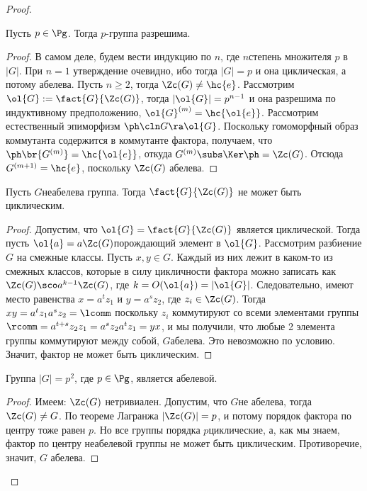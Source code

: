 \documentclass[a4paper]{article}
\newcommand{\kph}{\Ker \ph}
\begin{document}
\begin{proof}
\begin{theorem}
Пусть $p \in \Pg$. Тогда $p$-группа разрешима.
\end{theorem}
\begin{proof}
В самом деле, будем вести индукцию по $n$, где $n$\т степень множителя  $p$ в $|G|$. При $n=1$ утверждение
очевидно, ибо тогда $|G|=p$ и она циклическая, а потому абелева. Пусть $n \ge 2$, тогда $\Zc(G) \neq \hc{e}$.
Рассмотрим $\ol{G} := \fact{G}{\Zc(G)}$, тогда $|\ol{G}|=p^{n-1}$ и она разрешима по индуктивному
предположению,  $\ol{G}^{(m)}=\hc{\ol{e}}$. Рассмотрим естественный эпиморфизм $\ph\cln G \ra \ol{G}$.
Поскольку гомоморфный образ коммутанта содержится в коммутанте фактора, получаем, что $\ph\br{G^{(m)}} =
\hc{\ol{e}}$, откуда $G^{(m)} \subs \kph = \Zc(G)$. Отсюда $G^{(m+1)} = \hc{e}$, поскольку $\Zc(G)$\т
абелева.
\end{proof}

\begin{theorem}
Пусть $G$\т неабелева группа. Тогда $\fact{G}{\Zc(G)}$ не может быть циклическим.
\end{theorem}
\begin{proof}
Допустим, что $\ol{G} =\fact{G}{\Zc(G)}$ является циклической. Тогда пусть  $\ol{a}=a\Zc(G)$\т порождающий
элемент в $\ol{G}$. Рассмотрим разбиение $G$ на смежные классы. Пусть $x, y \in G$. Каждый из них лежит в
каком-то из смежных классов, которые в силу цикличности фактора можно записать как $\Zc(G)\sco
a^{k-1}\Zc(G)$, где $k = O(\ol{a})=|\ol{G}|$. Следовательно, имеют место равенства $x=a^tz_1$ и $y=a^sz_2$,
где $z_i \in \Zc(G)$. Тогда $xy=a^tz_1 a^sz_2=\lcomm$ поскольку $z_i$ коммутируют со всеми элементами группы
$\rcomm = a^{t+s} z_2 z_1 = a^s z_2 a^t z_1 = yx$, и мы получили, что любые 2 элемента группы коммутируют
между собой,  $G$\т абелева. Это невозможно по условию. Значит, фактор не может быть циклическим.
\end{proof}

\begin{imp}
Группа $|G| = p^2$, где $p \in \Pg$, является абелевой.
\end{imp}
\begin{proof}
Имеем: $\Zc(G)$ нетривиален. Допустим, что $G$\т не абелева,  тогда $\Zc(G) \neq G$. По теореме Лагранжа
$|\Zc(G)|=p$, и потому порядок фактора по центру тоже равен $p$. Но все группы порядка $p$\т циклические, а,
как мы знаем, фактор по центру неабелевой группы не может быть циклическим. Противоречие, значит, $G$\т
абелева.
\end{proof}


\end{proof}
\end{document}
